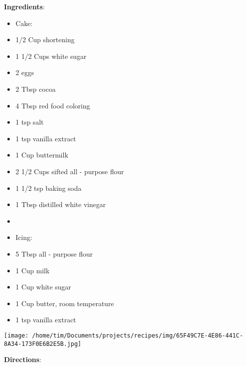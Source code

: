\documentclass[11pt, twoside, openany]{book}
\begin{document}
\begin{minipage}[t]{0.8\linewidth}
\textbf{Ingredients}:\vspace{-3mm}
\begin{multicols}{2}
\begin{itemize}\setlength\itemsep{-1mm}
\item Cake:
\item 1/2 Cup shortening
\item 1 1/2 Cups white sugar
\item 2 eggs
\item 2 Tbsp cocoa
\item 4 Tbsp red food coloring
\item 1 tsp salt
\item 1 tsp vanilla extract
\item 1 Cup buttermilk
\item 2 1/2 Cups sifted all - purpose flour
\item 1 1/2 tsp baking soda
\item 1 Tbsp distilled white vinegar
\item  
\item Icing:
\item 5 Tbsp all - purpose flour
\item 1 Cup milk
\item 1 Cup white sugar
\item 1 Cup butter, room temperature
\item 1 tsp vanilla extract
\end{itemize}
\end{multicols}
\end{minipage}
\begin{minipage}[t]{0.2\linewidth}
\centering \strut\vspace*{-\baselineskip}\newline
\texttt{[image: /home/tim/Documents/projects/recipes/img/65F49C7E-4E86-441C-8A34-173F0E6B2E5B.jpg]}\\
\end{minipage}\vspace{3mm}
\textbf{Directions}:
\end{document}
